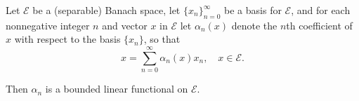 Let $\mathcal{E}$ be a (separable) Banach space, let $\{x_n\}_{n=0}^{\infty}$ be a basis for $\mathcal{E}$, and for each nonnegative integer $n$ and vector $x$ in $\mathcal{E}$ let $\alpha_n(x)$ denote the $n$th coefficient of $x$ with respect to the basis $\{x_n\}$, so that
$$x = \sum_{n=0}^{\infty} \alpha_n(x) x_n, \quad x \in \mathcal{E}.$$

Then $\alpha_n$ is a bounded linear functional on $\mathcal{E}$.
